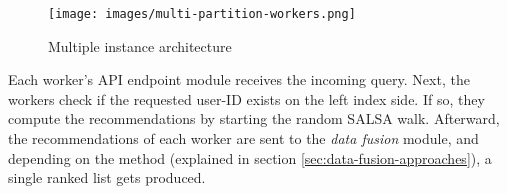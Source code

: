 \begin{figure}[!ht]
	\centering
	\texttt{[image: images/multi-partition-workers.png]}
	\caption{Multiple instance architecture}
	\label{fig:multiple-machine-architecture}
\end{figure}


Each worker's API endpoint module receives the incoming query. Next, the workers check if the requested user-ID exists on the left index side. If so, they compute the recommendations by starting the random SALSA walk. Afterward, the recommendations of each worker are sent to the \emph{data fusion} module, and depending on the method (explained in section \ref{sec:data-fusion-approaches}), a single ranked list gets produced.

